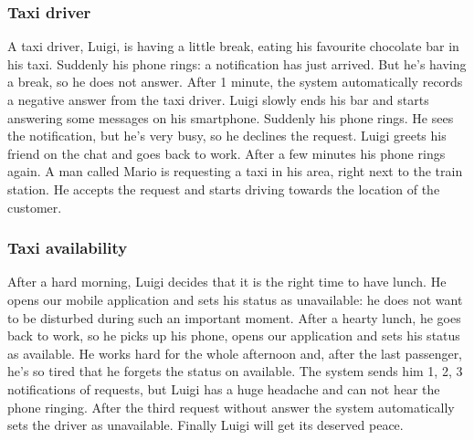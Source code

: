 		\subsubsection{Taxi driver}
			A taxi driver, Luigi, is having a little break, eating his favourite chocolate bar in his taxi. Suddenly
			his phone rings: a notification has just arrived. But he's having a break, so he does not answer.
			After 1 minute, the system automatically records a negative answer from the taxi driver.
			Luigi slowly ends his bar and starts answering some messages on his smartphone. Suddenly his phone
			rings. He sees the notification, but he's very busy, so he declines the request. Luigi greets his
			friend on the chat and goes back to work. After a few minutes his phone rings again. A man called
			Mario is requesting a taxi in his area, right next to the train station. He accepts the request and
			starts driving towards the location of the customer.
		\subsubsection{Taxi availability}
			After a hard morning, Luigi decides that it is the right time to have lunch. He opens our mobile
			application and sets his status as unavailable: he does not want to be disturbed during such an
			important moment. After a hearty lunch, he goes back to work, so he picks up his phone, opens our
			application and sets his status as available. He works hard for the whole afternoon and, after the
			last passenger, he's so tired that he forgets the status on available. The system sends him 1, 2, 3
			notifications of requests, but Luigi has a huge headache and can not hear the phone ringing. After
			the third request without answer the system automatically sets the driver as unavailable.
			Finally Luigi will get its deserved peace.
	\newpage
